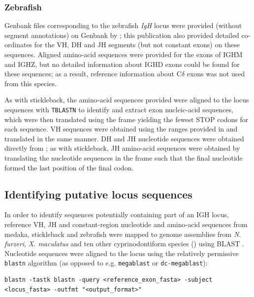 \subsubsection{Zebrafish}
\label{sec:ref_locus_dre}

Genbank files corresponding to the zebrafish \textit{IgH} locus were provided (without segment annotations) on Genbank by \citep{danilova2005zebrafish}; this publication also provided detailed co-ordinates for the VH, DH and JH segments (but not constant exons) on these sequences. Aligned amino-acid sequences were provided for the exons of IGHM and IGHZ, but no detailed information about IGHD exons could be found for these sequences; as a result, reference information about C$\delta$ exons was not used from this species.

As with stickleback, the amino-acid sequences provided were aligned to the locus sequences  with \lstinline{TBLASTN} to identify and extract exon nucleic-acid sequences, which were then translated using the frame yielding the fewest STOP codons for each sequence. VH sequences were obtained using the ranges provided in \citep{danilova2005zebrafish} and translated in the same manner. DH and JH nucleotide sequences were obtained directly from \citep{danilova2005zebrafish}; as with stickleback, JH amino-acid sequences were obtained by translating the nucleotide sequences in the frame such that the final nucleotide formed the last position of the final codon.

\subsection{Identifying putative locus sequences}
\label{sec:locus_scaffolds}

In order to identify sequences potentially containing part of an IGH locus, reference VH, JH and constant-region nucleotide and amino-acid sequences from medaka, stickleback and zebrafish were mapped to genome assemblies from \textit{N. furzeri}, \textit{X. maculatus} and ten other cyprinodontiform species () using BLAST \citep{altschul1990blast,altschul1997blast}. Nucleotide sequences were aligned to the locus using the relatively permissive \lstinline{blastn} algorithm (as opposed to e.g. \lstinline{megablast} or \lstinline{dc-megablast}):

\begin{lstlisting}
blastn -tastk blastn -query <reference_exon_fasta> -subject <locus_fasta> -outfmt "<output_format>"
\end{lstlisting}

